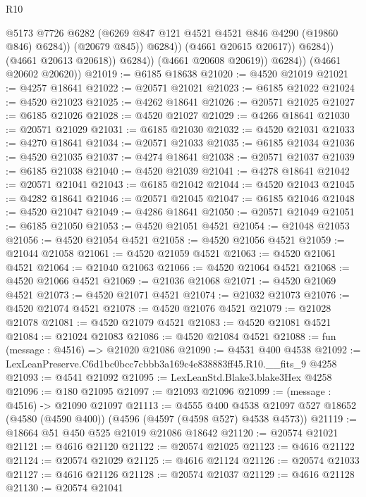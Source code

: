 \begin{lexlean}{R10}
\begin{coremodule}
                                @5173
                                @7726
                                @6282
                                (@6269 @847 @121 @4521 @4521 @846 @4290 (@19860 @846) @6284))
                              (@20679 @845))
                            @6284))
                        (@4661 @20615 @20617))
                      @6284))
                  (@4661 @20613 @20618))
                @6284))
            (@4661 @20608 @20619))
          @6284))
      (@4661 @20602 @20620))
@21019 := @6185 @18638
@21020 := @4520 @21019
@21021 := @4257 @18641
@21022 := @20571 @21021
@21023 := @6185 @21022
@21024 := @4520 @21023
@21025 := @4262 @18641
@21026 := @20571 @21025
@21027 := @6185 @21026
@21028 := @4520 @21027
@21029 := @4266 @18641
@21030 := @20571 @21029
@21031 := @6185 @21030
@21032 := @4520 @21031
@21033 := @4270 @18641
@21034 := @20571 @21033
@21035 := @6185 @21034
@21036 := @4520 @21035
@21037 := @4274 @18641
@21038 := @20571 @21037
@21039 := @6185 @21038
@21040 := @4520 @21039
@21041 := @4278 @18641
@21042 := @20571 @21041
@21043 := @6185 @21042
@21044 := @4520 @21043
@21045 := @4282 @18641
@21046 := @20571 @21045
@21047 := @6185 @21046
@21048 := @4520 @21047
@21049 := @4286 @18641
@21050 := @20571 @21049
@21051 := @6185 @21050
@21053 := @4520 @21051 @4521
@21054 := @21048 @21053
@21056 := @4520 @21054 @4521
@21058 := @4520 @21056 @4521
@21059 := @21044 @21058
@21061 := @4520 @21059 @4521
@21063 := @4520 @21061 @4521
@21064 := @21040 @21063
@21066 := @4520 @21064 @4521
@21068 := @4520 @21066 @4521
@21069 := @21036 @21068
@21071 := @4520 @21069 @4521
@21073 := @4520 @21071 @4521
@21074 := @21032 @21073
@21076 := @4520 @21074 @4521
@21078 := @4520 @21076 @4521
@21079 := @21028 @21078
@21081 := @4520 @21079 @4521
@21083 := @4520 @21081 @4521
@21084 := @21024 @21083
@21086 := @4520 @21084 @4521
@21088 := fun (message : @4516) => @21020 @21086
@21090 := @4531 @400 @4538
@21092 := LexLeanPreserve.C6d1bc0bcc7cbbb3a169c4e838883ff45.R10.__fits_9 @4258
@21093 := @4541 @21092
@21095 := LexLeanStd.Blake3.blake3Hex @4258
@21096 := @180 @21095
@21097 := @21093 @21096
@21099 := (message : @4516) -> @21090 @21097
@21113 := @4555
    @400
    @4538
    @21097
    @527
    @18652
    (@4580 (@4590 @400))
    (@4596 (@4597 (@4598 @527) @4538 @4573))
@21119 := @18664 @51 @450 @525 @21019 @21086 @18642
@21120 := @20574 @21021
@21121 := @4616 @21120
@21122 := @20574 @21025
@21123 := @4616 @21122
@21124 := @20574 @21029
@21125 := @4616 @21124
@21126 := @20574 @21033
@21127 := @4616 @21126
@21128 := @20574 @21037
@21129 := @4616 @21128
@21130 := @20574 @21041

\end{coremodule}
\end{lexlean}
